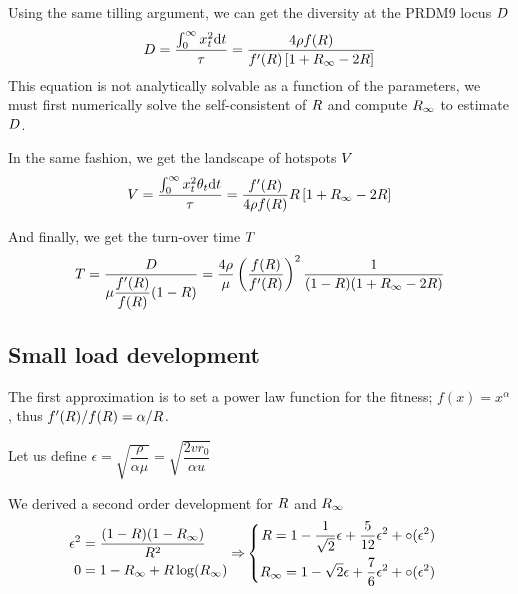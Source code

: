 \documentclass{article}
\begin{document}
Using the same tilling argument, we can get the diversity at the PRDM9 locus $D$
\begin{equation}
  D = \dfrac{\int_{0}^{\infty } x_{t}^2 \mathrm{d}  t}{\tau} = \dfrac{4\rho f(R )}{f'(R )\left[ 1 + {R_{\infty}}  - 2 R   \right]} 
\end{equation}
This equation is not analytically solvable as a function of the parameters, we must first numerically solve the self-consistent of $R$ and compute ${R_{\infty}}$ to estimate $D$.

In the same fashion, we get the landscape of hotspots $V$
\begin{equation}
    V = \dfrac{\int_{0}^{\infty } x_{t}^2 \theta_{t} \mathrm{d}  t}{\tau} = \dfrac{f'(R )}{4 \rho f(R )}R \left[ 1 + {R_{\infty}}  - 2 R   \right] 
\end{equation}

And finally, we get the turn-over time $T$ 
\begin{equation}
  T = \dfrac{D}{\mu \dfrac{f'(R )}{ f(R )} (1-R )}  = \dfrac{4 \rho }{ \mu} \left( \dfrac{ f(R )}{f'(R )} \right)^2  \dfrac{1}{(1-R )( 1 + {R_{\infty}}  - 2 R   )} 
\end{equation}

\subsection*{Small load development}
The first approximation is to set a power law function for the fitness; $f(x)=x^{\alpha}$, thus $f'(R)/f(R)= \alpha / R$.

Let us define $\epsilon =  \sqrt{\dfrac{ \rho }{ \alpha \mu }} = \sqrt{\dfrac{2 v r_0}{\alpha u}}$

We derived a second order development for $R$ and ${R_{\infty}}$
\begin{align} 
  \begin{aligned}
    \epsilon^2  &= \dfrac{(1- R )(1- {R_{\infty}} )}{R^2} \\
     0 &= 1-{R_{\infty}}  + R  \operatorname{log}({R_{\infty}} ) \\    
     \end{aligned}
    \Rightarrow &
    \left\{
  \begin{aligned}
     R =  1 - \dfrac{1}{\sqrt{2}} \epsilon + \dfrac{5}{12} \epsilon^2 + \circ ( \epsilon^2)\\
     {R_{\infty}} =  1 - \sqrt{2} \epsilon + \dfrac{7}{6} \epsilon^2 + \circ ( \epsilon^2)\\
     \end{aligned}
  \right.
\end{align}
\end{document}
